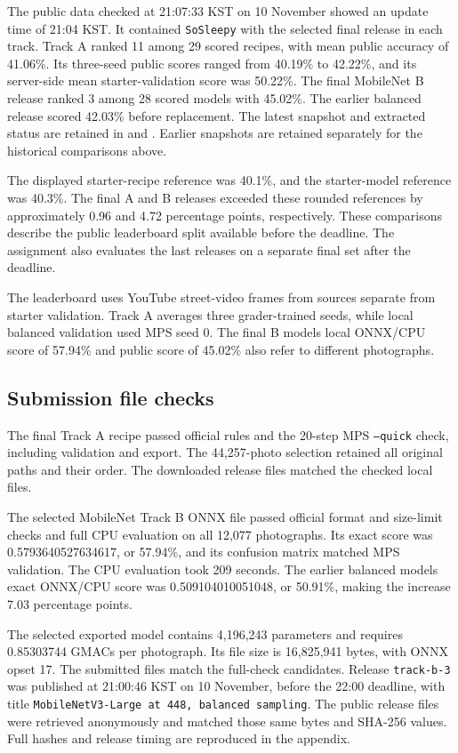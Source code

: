 \documentclass[11pt]{article}
\begin{document}
The public data checked at 21:07:33 KST on 10 November showed an update
time of 21:04 KST. It contained \texttt{SoSleepy} with the selected final
release in each track. Track A ranked 11 among 29 scored recipes, with mean public accuracy of
41.06\%. Its three-seed public scores ranged from 40.19\% to 42.22\%,
and its server-side mean starter-validation score was 50.22\%.
The final MobileNet B release ranked 3 among 28 scored models with
45.02\%. The earlier balanced release scored 42.03\% before replacement.
The latest snapshot and extracted status are retained in
 and
. Earlier snapshots are retained
separately for the historical comparisons above.

The displayed starter-recipe reference was 40.1\%, and the starter-model
reference was 40.3\%. The final A and B releases
exceeded these rounded references by approximately 0.96 and 4.72 percentage
points, respectively. These comparisons describe the public leaderboard
split available before the deadline. The assignment also evaluates the last
releases on a separate final set after the deadline.

The leaderboard uses YouTube street-video frames from sources separate
from starter validation. Track A averages three grader-trained seeds,
while local balanced validation used MPS seed 0. The final B model\textquotesingle{}s
local ONNX/CPU score of 57.94\% and public score of 45.02\% also refer
to different photographs.

\subsection{Submission file checks}

The final Track A recipe passed official rules and the 20-step MPS
\texttt{--quick} check, including validation and export. The 44,257-photo
selection retained all original paths and their order. The downloaded
release files matched the checked local files.

The selected MobileNet Track B ONNX file passed official format and
size-limit checks and full CPU evaluation on all 12,077 photographs.
Its exact score was 0.5793640527634617, or 57.94\%, and its confusion
matrix matched MPS validation. The CPU evaluation took 209 seconds.
The earlier balanced model\textquotesingle{}s exact ONNX/CPU score was
0.509104010051048, or 50.91\%, making the increase 7.03 percentage points.

The selected exported model contains 4,196,243 parameters and requires
0.85303744 GMACs per photograph. Its file size is 16,825,941 bytes,
with ONNX opset 17. The submitted files match the full-check candidates.
Release \texttt{track-b-3} was published at 21:00:46 KST on 10 November,
before the 22:00 deadline, with title
\texttt{MobileNetV3-Large at 448, balanced sampling}.
The public release files were retrieved anonymously and matched those
same bytes and SHA-256 values. Full hashes and release timing are
reproduced in the appendix.
\end{document}
